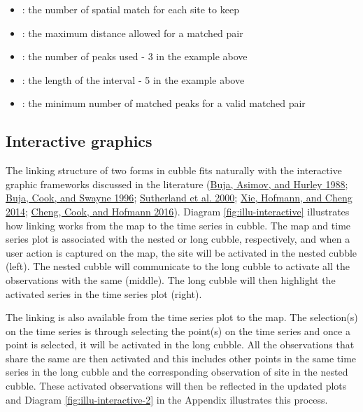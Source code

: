 \documentclass{article}
\providecommand{\tightlist}{%
  \setlength{\itemsep}{0pt}\setlength{\parskip}{0pt}}
\begin{document}
\begin{itemize}
\tightlist
\item
  : the number of spatial match for each site to keep
\item
  : the maximum distance allowed for a matched pair
\item
  : the number of peaks used - 3 in the example above
\item
  : the length of the interval - 5 in the example above
\item
  : the minimum number of matched peaks for a valid matched pair
\end{itemize}

\hypertarget{interactive-graphics}{%
\subsection{Interactive graphics}\label{interactive-graphics}}

The linking structure of two forms in cubble fits naturally with the interactive graphic frameworks discussed in the literature (\protect\hyperlink{ref-buja1988elements}{Buja, Asimov, and Hurley 1988}; \protect\hyperlink{ref-buja1996interactive}{Buja, Cook, and Swayne 1996}; \protect\hyperlink{ref-sutherland2000orca}{Sutherland et al. 2000}; \protect\hyperlink{ref-xie2014reactive}{Xie, Hofmann, and Cheng 2014}; \protect\hyperlink{ref-cheng2016enabling}{Cheng, Cook, and Hofmann 2016}). Diagram \ref{fig:illu-interactive} illustrates how linking works from the map to the time series in cubble. The map and time series plot is associated with the nested or long cubble, respectively, and when a user action is captured on the map, the site will be activated in the nested cubble (left). The nested cubble will communicate to the long cubble to activate all the observations with the same  (middle). The long cubble will then highlight the activated series in the time series plot (right).

The linking is also available from the time series plot to the map. The selection(s) on the time series is through selecting the point(s) on the time series and once a point is selected, it will be activated in the long cubble. All the observations that share the same  are then activated and this includes other points in the same time series in the long cubble and the corresponding observation of site in the nested cubble. These activated observations will then be reflected in the updated plots and Diagram \ref{fig:illu-interactive-2} in the Appendix illustrates this process.
\end{document}
